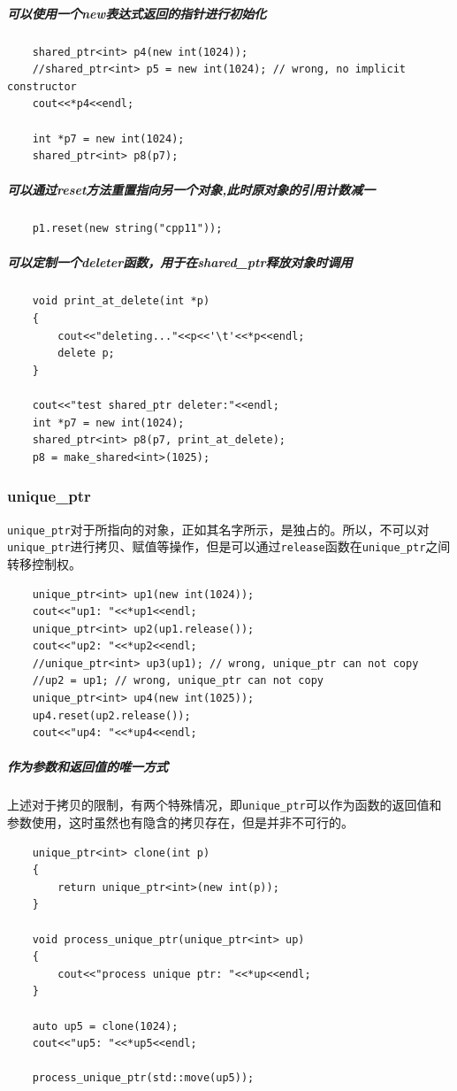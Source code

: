 \documentclass[UTF8,a4paper,12pt]{ctexbook} %
\begin{document}
			\subparagraph{可以使用一个new表达式返回的指针进行初始化}
				\begin{lstlisting}
	shared_ptr<int> p4(new int(1024));
	//shared_ptr<int> p5 = new int(1024); // wrong, no implicit constructor
	cout<<*p4<<endl;	
	
	int *p7 = new int(1024);
	shared_ptr<int> p8(p7);
				\end{lstlisting}
			
			\subparagraph{可以通过reset方法重置指向另一个对象,此时原对象的引用计数减一}
				\begin{lstlisting}
	p1.reset(new string("cpp11"));
				\end{lstlisting}
			
			\subparagraph{可以定制一个deleter函数，用于在shared\_ptr释放对象时调用}
				\begin{lstlisting}
	void print_at_delete(int *p)
	{
		cout<<"deleting..."<<p<<'\t'<<*p<<endl;
		delete p;
	}
	
	cout<<"test shared_ptr deleter:"<<endl;
	int *p7 = new int(1024);
	shared_ptr<int> p8(p7, print_at_delete);
	p8 = make_shared<int>(1025);
				\end{lstlisting}
			\subsubsection{unique\_ptr}
				\verb|unique_ptr|对于所指向的对象，正如其名字所示，是独占的。所以，不可以对\verb|unique_ptr|进行拷贝、赋值等操作，但是可以通过\verb|release|函数在\verb|unique_ptr|之间转移控制权。
				\begin{lstlisting}
	unique_ptr<int> up1(new int(1024));
	cout<<"up1: "<<*up1<<endl;
	unique_ptr<int> up2(up1.release());
	cout<<"up2: "<<*up2<<endl;
	//unique_ptr<int> up3(up1); // wrong, unique_ptr can not copy
	//up2 = up1; // wrong, unique_ptr can not copy
	unique_ptr<int> up4(new int(1025));
	up4.reset(up2.release());
	cout<<"up4: "<<*up4<<endl;
				\end{lstlisting}
			\subparagraph{作为参数和返回值的唯一方式}上述对于拷贝的限制，有两个特殊情况，即\verb|unique_ptr|可以作为函数的返回值和参数使用，这时虽然也有隐含的拷贝存在，但是并非不可行的。
				\begin{lstlisting}
	unique_ptr<int> clone(int p)
	{
		return unique_ptr<int>(new int(p));
	}
	
	void process_unique_ptr(unique_ptr<int> up)
	{
		cout<<"process unique ptr: "<<*up<<endl;
	}
	
	auto up5 = clone(1024);
	cout<<"up5: "<<*up5<<endl;
	
	process_unique_ptr(std::move(up5));
				\end{lstlisting}
\end{document}
